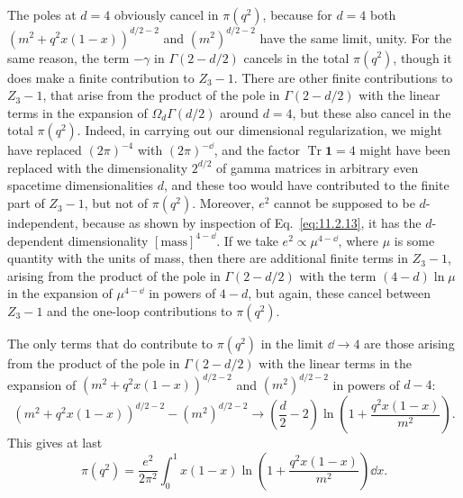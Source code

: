 The poles at $d=4$ obviously cancel in $\pi(q^2)$, because for $d=4$ both
$(m^2+q^2x(1-x))^{d/2-2}$ and $(m^2)^{d/2-2}$ have the same limit,
unity. For the same reason, the term $-\gamma$ in $\Gamma(2-d/2)$ cancels
in the total $\pi(q^2)$, though it does make a finite contribution to
$Z_3-1$. There are other finite contributions to $Z_3-1$, that arise from
the product of the pole in $\Gamma(2-d/2)$ with the linear terms in the
expansion of $\Omega_d\Gamma(d/2)$ around $d=4$, but these also cancel in
the total $\pi(q^2)$. Indeed, in carrying out our dimensional regularization,
we might have replaced $(2\pi)^{-4}$ with $(2\pi)^{-\dd}$, and the factor
$\operatorname{Tr}\mathbf{1}=4$ might have been replaced with the dimensionality
$2^{d/2}$ of gamma matrices in arbitrary even spacetime dimensionalities
$d$, and these too would have contributed to the finite part of $Z_3-1$,
but not of $\pi(q^2)$. Moreover, $e^2$ cannot be supposed to be
$d$-independent, because as shown by inspection of Eq.~\eqref{eq:11.2.13}, it has
the $d$-dependent dimensionality $[\text{mass}]^{4-\dd}$. If we take
$e^2\propto\mu^{4-\dd}$, where $\mu$ is some quantity with the units of mass,
then there are additional finite terms in $Z_3-1$, arising from the product
of the pole in $\Gamma(2-d/2)$ with the term $(4-d)\ln\mu$ in the
expansion of $\mu^{4-\dd}$ in powers of $4-d$, but again, these cancel between
$Z_3-1$ and the one-loop contributions to $\pi(q^2)$.

The only terms that do contribute to $\pi(q^2)$ in the limit $\dd\to4$ are
those arising from the product of the pole in $\Gamma(2-d/2)$ with the
linear terms in the expansion of $(m^2+q^2x(1-x))^{d/2-2}$ and
$(m^2)^{d/2-2}$ in powers of $d-4$:
\begin{equation}
  (m^2+q^2x(1-x))^{d/2-2}-(m^2)^{d/2-2}
  \longrightarrow\left(\frac d2-2\right)
  \ln\left(1+\frac{q^2x(1-x)}{m^2}\right).
  \tag{11.2.21}\label{eq:11.2.21}
\end{equation}
This gives at last
\begin{equation}
  \pi(q^2)=\frac{e^2}{2\pi^2}\int_0^1x(1-x)
  \ln\left(1+\frac{q^2x(1-x)}{m^2}\right)\dd x.
  \tag{11.2.22}\label{eq:11.2.22}
\end{equation}

